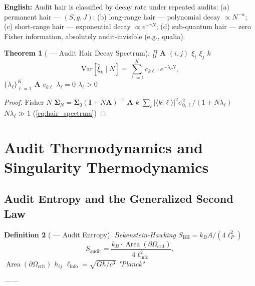 \documentclass[12pt,a4paper]{article}
\newtheorem{theorem}{Theorem}[section]
\newtheorem{definition}[theorem]{Definition}
\theoremstyle{remark}
\newcommand{\Var}{\mathrm{Var}}
\DeclareMathOperator{\Area}{Area}
\newcommand{\rigorFull}{\textnormal{\textbf{[]}}}
\newcommand{\cG}{G}          %
\newcommand{\cC}{c}          %
\newcommand{\cH}{\hbar}      %
\begin{document}
\vspace{4pt}
\noindent
\textbf{English:} Audit hair is classified by decay rate under repeated audits: (a) permanent hair — $(S, g, J)$; (b) long-range hair — polynomial decay $\propto N^{-\alpha}$; (c) short-range hair — exponential decay $\propto e^{-\gamma N}$; (d) sub-quantum hair — zero Fisher information, absolutely audit-invisible (e.g., qualia).

\begin{theorem}[ — Audit Hair Decay Spectrum]\label{thm:hair_decay}\rigorFull
 $\mathbf{A}$ $(i,j)$  $\xi_i$  $\xi_j$  $k$ 
\begin{equation}
    \Var[\hat{\xi}_k \mid N] = \sum_{\ell=1}^K c_{k\ell} \cdot e^{-\lambda_\ell N},
    \label{eq:hair_spectrum}
\end{equation}
 $\{\lambda_\ell\}_{\ell=1}^K$  $\mathbf{A}$ $c_{k\ell}$ $\lambda_\ell = 0$ $\lambda_\ell > 0$ 
\end{theorem}

\begin{proof}
Fisher $N$  $\mathbf{\Sigma}_N = \mathbf{\Sigma}_0(\mathbf{I} + N\mathbf{A})^{-1}$ $\mathbf{A}$  $k$  $\sum_{\ell} |\langle k|\ell\rangle|^2 \sigma^2_{0,\ell}/(1 + N\lambda_\ell)$ $N\lambda_\ell \gg 1$  (\ref{eq:hair_spectrum}) 
\end{proof}

\section{}
\section{Audit Thermodynamics and Singularity Thermodynamics}

\subsection{}
\subsection{Audit Entropy and the Generalized Second Law}

\begin{definition}[ — Audit Entropy]\label{def:audit_entropy}
Bekenstein-Hawking $S_{\mathrm{BH}} = k_B A/(4\ell_P^2)$\textbf{}
\begin{equation}
    S_{\mathrm{audit}} = \frac{k_B \cdot \Area(\partial\Omega_{\mathrm{crit}})}{4\ell_{\mathrm{info}}^2},
    \label{eq:audit_entropy}
\end{equation}
 $\Area(\partial\Omega_{\mathrm{crit}})$  $h_{ij}$ $\ell_{\mathrm{info}} = \sqrt{\cG\cH/\cC^3}$ "Planck"

\textbf{}——
\end{definition}
\end{document}
